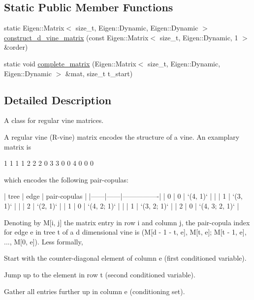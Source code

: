 \subsection*{Static Public Member Functions}
\begin{DoxyCompactItemize}
\item 
static Eigen\+::\+Matrix$<$ size\+\_\+t, Eigen\+::\+Dynamic, Eigen\+::\+Dynamic $>$ \hyperlink{classvinecopulib_1_1_r_vine_matrix_ad523b84e2ea41eba4eb982eb9b39471b}{construct\+\_\+d\+\_\+vine\+\_\+matrix} (const Eigen\+::\+Matrix$<$ size\+\_\+t, Eigen\+::\+Dynamic, 1 $>$ \&order)
\item 
static void \hyperlink{classvinecopulib_1_1_r_vine_matrix_a89aa5b0f2d11630ec9aaac995c08695e}{complete\+\_\+matrix} (Eigen\+::\+Matrix$<$ size\+\_\+t, Eigen\+::\+Dynamic, Eigen\+::\+Dynamic $>$ \&mat, size\+\_\+t t\+\_\+start)
\end{DoxyCompactItemize}


\subsection{Detailed Description}
A class for regular vine matrices. 

A regular vine (R-\/vine) matrix encodes the structure of a vine. An examplary matrix is 
\begin{DoxyCode}
1 1 1 1
2 2 2 0
3 3 0 0
4 0 0 0
\end{DoxyCode}
 which encodes the following pair-\/copulas\+: 
\begin{DoxyCode}
| tree | edge | pair-copulas   |
|------|------|----------------|
| 0    | 0    | `(4, 1)`       |
|      | 1    | `(3, 1)`       |
|      | 2    | `(2, 1)`       |
| 1    | 0    | `(4, 2; 1)`    |
|      | 1    | `(3, 2; 1)`    |
| 2    | 0    | `(4, 3; 2, 1)` |
\end{DoxyCode}
 Denoting by {\ttfamily M\mbox{[}i, j\mbox{]}} the matrix entry in row {\ttfamily i} and column {\ttfamily j}, the pair-\/copula index for edge {\ttfamily e} in tree {\ttfamily t} of a {\ttfamily d} dimensional vine is {\ttfamily (M\mbox{[}d -\/ 1 -\/ t, e\mbox{]}, M\mbox{[}t, e\mbox{]}; M\mbox{[}t -\/ 1, e\mbox{]}, ..., M\mbox{[}0, e\mbox{]})}. Less formally,
\begin{DoxyEnumerate}
\item Start with the counter-\/diagonal element of column {\ttfamily e} (first conditioned variable).
\item Jump up to the element in row {\ttfamily t} (second conditioned variable).
\item Gather all entries further up in column {\ttfamily e} (conditioning set).
\end{DoxyEnumerate}

